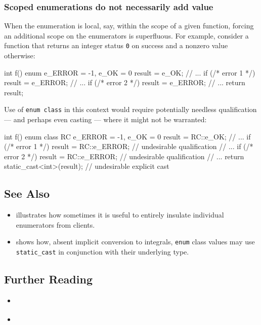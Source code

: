 \subsubsection[Scoped enumerations do not necessarily add value]{Scoped enumerations do not necessarily add value}\label{scoped-enumerations-do-not-necessarily-add-value}

When the enumeration is local, say, within the scope of a given
function, forcing an additional scope on the enumerators is superfluous.
For example, consider a function that returns an integer status
\lstinline!0! on success and a nonzero value otherwise:

\begin{emcppslisting}[emcppserrorlines={5,7}]
int f()
{
    enum { e_ERROR = -1, e_OK = 0 } result = e_OK;
    // ...
    if (/* error 1 */) { result = e_ERROR; }
    // ...
    if (/* error 2 */) { result = e_ERROR; }
    // ...
    return result;
}
\end{emcppslisting}

\noindent Use of \lstinline!enum!~\lstinline!class! in this context would require
potentially needless qualification --- and perhaps even casting ---
where it might not be warranted:

\begin{emcppslisting}[emcppserrorlines={5,7}]
int f()
{
    enum class RC { e_ERROR = -1, e_OK = 0 } result = RC::e_OK;
    // ...
    if (/* error 1 */) { result = RC::e_ERROR; } // undesirable qualification
    // ...
    if (/* error 2 */) { result = RC::e_ERROR; } // undesirable qualification
    // ...
    return static_cast<int>(result);  // undesirable explicit cast
}
\end{emcppslisting}

\subsection[See Also]{See Also}\label{see-also}

\begin{itemize}
\item{illustrates how sometimes it is useful to entirely insulate individual enumerators from clients.}
\item{shows how, absent implicit conversion to integrals, \lstinline!enum! class values may use \lstinline!static_cast! in conjunction with their underlying type.}
\end{itemize}

\subsection[Further Reading]{Further Reading}\label{further-reading}

\begin{itemize}
\item{\cite{miller19}}
\item{\cite{meyers15}}
\end{itemize}


